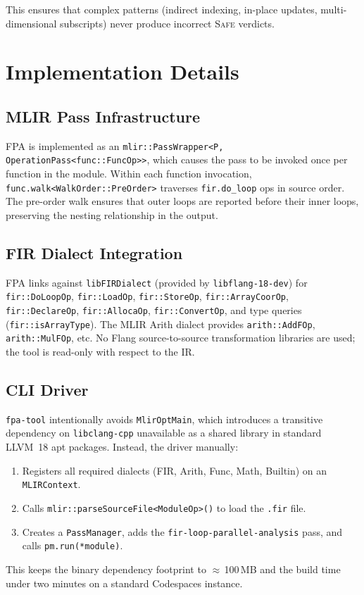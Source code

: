 \documentclass[conference]{IEEEtran}
\begin{document}
This ensures that complex patterns (indirect indexing, in-place
updates, multi-dimensional subscripts) never produce incorrect
\textsc{Safe} verdicts.

\section{Implementation Details}
\label{sec:implementation}

\subsection{MLIR Pass Infrastructure}

FPA is implemented as an \texttt{mlir::PassWrapper<P,
OperationPass<func::FuncOp>>}, which causes the pass to be invoked
once per function in the module.  Within each function invocation,
\texttt{func.walk<WalkOrder::PreOrder>} traverses
\texttt{fir.do\_loop} ops in source order.  The pre-order walk
ensures that outer loops are reported before their inner loops,
preserving the nesting relationship in the output.

\subsection{FIR Dialect Integration}

FPA links against \texttt{libFIRDialect} (provided by
\texttt{libflang-18-dev}) for \texttt{fir::DoLoopOp},
\texttt{fir::LoadOp}, \texttt{fir::StoreOp},
\texttt{fir::ArrayCoorOp}, \texttt{fir::DeclareOp},
\texttt{fir::AllocaOp}, \texttt{fir::ConvertOp}, and type queries
(\texttt{fir::isArrayType}).  The MLIR Arith dialect provides
\texttt{arith::AddFOp}, \texttt{arith::MulFOp}, etc.  No Flang
source-to-source transformation libraries are used; the tool is
read-only with respect to the IR.

\subsection{CLI Driver}

\texttt{fpa-tool} intentionally avoids \texttt{MlirOptMain}, which
introduces a transitive dependency on \texttt{libclang-cpp}
unavailable as a shared library in standard LLVM~18 apt packages.
Instead, the driver manually:
\begin{enumerate}
  \item Registers all required dialects (FIR, Arith, Func, Math,
        Builtin) on an \texttt{MLIRContext}.
  \item Calls \texttt{mlir::parseSourceFile<ModuleOp>()} to load the
        \texttt{.fir} file.
  \item Creates a \texttt{PassManager}, adds the
        \texttt{fir-loop-parallel-analysis} pass, and calls
        \texttt{pm.run(*module)}.
\end{enumerate}
This keeps the binary dependency footprint to
$\approx$\,100\,MB and the build time under two minutes on a
standard Codespaces instance.
\end{document}
